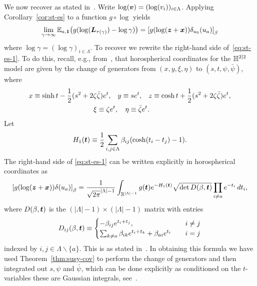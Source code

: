 \documentclass[11pt,a4paper]{article}
\let\originalleft\left
\let\originalright\right
\renewcommand{\left}{\mathopen{}\mathclose\bgroup\originalleft}
\renewcommand{\right}{\aftergroup\egroup\originalright}
\begin{document}
We now recover \cite[Theorem~2]{MR3420510} as stated
in~\cite[Theorem~B]{MR3904155}. Write $\log(\boldsymbol{v}) =
(\log(v_i))_{i\in\Lambda}$. Applying Corollary~\ref{cor:st-es} to
a function $g\circ \log $ yields
\begin{equation}
    \label{eq:st-es-1}
    \lim_{\gamma \rightarrow \infty}\E_{a,\V{1}}\left(g(\log(\V{L}_{\tau(\gamma)}) - \log \gamma)\right)
    = \uspin{g(\log(\V{z}+ \V{x}))\delta_{u_{0}}(u_a)}_{\beta}
  \end{equation}
  where $\log \gamma = (\log \gamma)_{i\in\Lambda}$.
  To recover \cite[Theorem~2]{MR3420510} we
  rewrite the right-hand side of~\eqref{eq:st-es-1}. To do this,
  recall, e.g., from~\cite[Section~2.2]{MR2728731}, that horospherical
  coordinates for the $\mathbb{H}^{2|2}$ model are given by the change of
  generators from $(x,y,\xi,\eta)$ to $(s,t,\psi,\bar\psi)$, where
  \begin{equation}
    \begin{split}
      x \equiv \sinh{t} - \frac{1}{2}(s^2 + 2\zeta\bar{\zeta})e^t, \;\;\; y
      &\equiv se^{t},\;\;\;
      z \equiv \cosh{t} + \frac{1}{2}(s^2 + 2\zeta\bar{\zeta})e^{t},\\
      \xi \equiv \zeta e^{t},\;\;&\;\; \eta \equiv \bar{\zeta} e^{t}.
    \end{split}
  \end{equation}
  Let
  \begin{equation}
    \label{eq:H1}
    H_1(\boldsymbol{t}) \equiv 
    \frac{1}{2}\sum_{i,j\in\Lambda} \beta_{ij} (\cosh(t_i - t_j) - 1).
  \end{equation}
  The right-hand side of \eqref{eq:st-es-1} can be written
  explicitly in horospherical coordinates as
  \begin{equation} \label{e:SThoro} \uspin{g(\log(\V{z}+
      \V{x}))\delta(u_a)}_{\beta} =
    \frac{1}{\sqrt{2\pi}^{|\Lambda|-1}} \int_{
      \R^{|\Lambda|-1}}g(\V{t})e^{-H_1(\V{t})}\sqrt{\det{D(\beta,\V{t})}}
    \prod_{i\neq a} e^{-t_{i}}\,dt_{i},
  \end{equation}
  where $D(\beta,\boldsymbol{t})$ is the $(|\Lambda|-1)\times(|\Lambda|-1)$
  matrix with entries
  \begin{equation}
    D_{ij}(\beta, \boldsymbol{t}) \equiv
    \begin{cases} 
      -\beta_{ij}e^{t_i +t_j},\quad &i\ne j \\
      \sum_{k\ne a} \beta_{ik}e^{t_i + t_k} + \beta_{ai}e^{t_i} \quad
      &i = j
    \end{cases}
  \end{equation}
  indexed by $i,j \in \Lambda\backslash\{a\}$.
  This is \cite[Theorem~2]{MR3420510} as stated
  in~\cite[Theorem~B]{MR3904155}. In obtaining this formula we have
  used Theorem~\ref{thm:susy-cov} to perform the change of generators
  and then integrated out $s,\psi$ and $\bar\psi$, which can be done
  explicitly as conditioned on the $t$-variables these are Gaussian integrals,
  see~\cite[Section~2.3]{MR2728731}.
\end{document}

